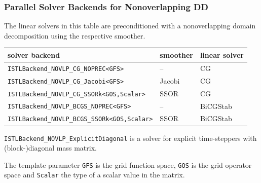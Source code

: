 \begin{frame}
  \frametitle{Parallel Solver Backends for Nonoverlapping DD}
The linear solvers in this table are preconditioned with a nonoverlapping domain decomposition
using the respective smoother.
\begin{center}
\begin{tabular}{|l|l|l|}\hline
solver backend & smoother & linear solver\\\hline
\lstinline!ISTLBackend_NOVLP_CG_NOPREC<GFS>! & -- & CG\\\hline
\lstinline!ISTLBackend_NOVLP_CG_Jacobi<GFS>! & Jacobi & CG\\\hline
\lstinline!ISTLBackend_NOVLP_CG_SSORk<GOS,Scalar>! & SSOR & CG\\\hline
\lstinline!ISTLBackend_NOVLP_BCGS_NOPREC<GFS>! & -- & BiCGStab\\\hline
\lstinline!ISTLBackend_NOVLP_BCGS_SSORk<GOS,Scalar>! & SSOR & BiCGStab\\\hline
\end{tabular}
\end{center}
\lstinline!ISTLBackend_NOVLP_ExplicitDiagonal! is a solver for explicit 
time-steppers with (block-)diagonal mass matrix.

The template parameter \lstinline!GFS! is the grid function space, \lstinline!GOS! is the grid operator space
and \lstinline!Scalar! the type of a scalar value in the matrix.
\end{frame}

